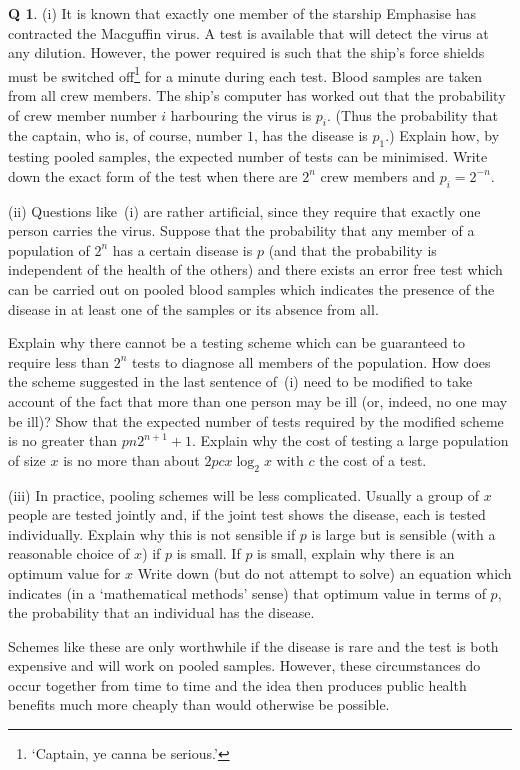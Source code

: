 \documentclass[12pt,a4paper]{article}
\theoremstyle{plain}
\theoremstyle{definition}
\newtheorem{question}[theorem]{Q}
\begin{document}
    \begin{question}
        \label{C1.11} (i) It is known that
        exactly one member of the
        starship Emphasise has contracted the Macguffin virus.
        A test is available that will detect the virus at any dilution.
        However, the power required is such that the ship's
        force shields
        must be switched off\footnote{`Captain, ye canna be serious.'}
        for a minute during each test. Blood samples are taken
        from all crew members. The ship's computer has worked
        out that the probability of crew member number $i$
        harbouring the virus is $p_{i}$. (Thus the probability that
        the captain, who is, of course, number $1$, has the disease
        is $p_{1}$.)
        Explain how,
        by testing pooled
        samples, the expected number of tests can be minimised.
        Write down the exact form of the test when there are $2^{n}$
        crew members and $p_{i}=2^{-n}$.

        (ii) Questions like~(i) are rather artificial,
        since they require that exactly one person carries the virus.
        Suppose that the probability that any member of a population
        of $2^{n}$ has a certain disease is $p$ (and that
        the probability is independent of the health of the others)
        and there exists an error free test which can be carried out on pooled
        blood samples which indicates the presence of the
        disease in at least one of the samples or its absence from all.

        Explain why there cannot be a testing scheme
        which can be guaranteed to require less than $2^{n}$
        tests to diagnose all members of
        the population. How does the scheme suggested
        in the last sentence of~(i) need to be modified to take
        account of the fact that more than one person
        may be ill (or, indeed, no one may be ill)?
        Show that the expected number of tests required by
        the modified scheme is no greater than
        $pn2^{n+1}+1$. Explain why the cost of testing
        a large population of size $x$ is no more than about
        $2pcx\log_{2} x$ with $c$ the cost of a test.

        (iii) In practice, pooling schemes will be less complicated.
        Usually a group of $x$ people are tested jointly
        and, if the joint test shows the disease, each is tested individually.
        Explain why this is not sensible if $p$ is large
        but is sensible (with a reasonable choice of $x$)
        if $p$ is small.
        If $p$ is small, explain why there is an optimum value for $x$
        Write down (but do not
        attempt to solve)
        an equation which indicates (in a `mathematical methods' sense)
        that optimum value
        in terms of $p$, the probability that an individual has the
        disease.

        Schemes like these are only worthwhile if the disease is rare and
        the test is both expensive and will work on pooled samples.
        However, these circumstances do occur together from
        time to time and the idea then produces public health
        benefits much more cheaply than would otherwise be possible.
    \end{question}
\end{document}
